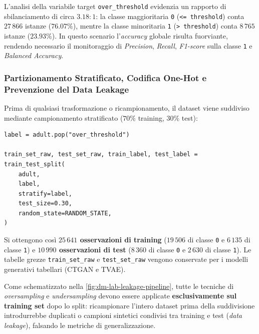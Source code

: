 L'analisi della variabile target \texttt{over\_threshold} evidenzia un rapporto di sbilanciamento di circa $3.18 : 1$: la classe maggioritaria \texttt{0} (\texttt{<= threshold}) conta \textbf{$27\,866$} istanze ($76.07\%$), mentre la classe minoritaria \texttt{1} (\texttt{> threshold}) conta \textbf{$8\,765$} istanze ($23.93\%$). In questo scenario l'\textit{accuracy} globale risulta fuorviante, rendendo necessario il monitoraggio di \textit{Precision}, \textit{Recall}, \textit{F1-score} sulla classe \texttt{1} e \textit{Balanced Accuracy}.

\FloatBarrier
\subsubsection{Partizionamento Stratificato, Codifica One-Hot e Prevenzione del Data Leakage}
\label{subsec:dm-lab-adult-split}

Prima di qualsiasi trasformazione o ricampionamento, il dataset viene suddiviso mediante campionamento stratificato ($70\%$ training, $30\%$ test):

\begin{lstlisting}[style=pythoncode, caption={Partizionamento stratificato train/test preliminare al ricampionamento.}]
label = adult.pop("over_threshold")

train_set_raw, test_set_raw, train_label, test_label = train_test_split(
    adult,
    label,
    stratify=label,
    test_size=0.30,
    random_state=RANDOM_STATE,
)
\end{lstlisting}

Si ottengono cos\`i \textbf{$25\,641$ osservazioni di training} ($19\,506$ di classe \texttt{0} e $6\,135$ di classe \texttt{1}) e \textbf{$10\,990$ osservazioni di test} ($8\,360$ di classe \texttt{0} e $2\,630$ di classe \texttt{1}). Le tabelle grezze \texttt{train\_set\_raw} e \texttt{test\_set\_raw} vengono conservate per i modelli generativi tabellari (CTGAN e TVAE).

Come schematizzato nella \autoref{fig:dm-lab-leakage-pipeline}, tutte le tecniche di \textit{oversampling} e \textit{undersampling} devono essere applicate \textbf{esclusivamente sul training set} dopo lo split: ricampionare l'intero dataset prima della suddivisione introdurrebbe duplicati o campioni sintetici condivisi tra training e test (\textit{data leakage}), falsando le metriche di generalizzazione.

